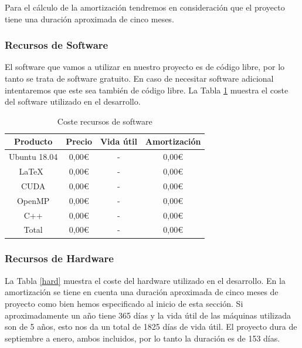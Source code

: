 \documentclass[titlepage,12pt]{report}
\begin{document}
Para el cálculo de la amortización tendremos en consideración que el proyecto tiene una duración aproximada de cinco meses.

\subsubsection{Recursos de Software}

El software que vamos a utilizar en nuestro proyecto es de código libre, por lo tanto se trata de software gratuito. En caso de necesitar software adicional intentaremos que este sea también de código libre. La Tabla \ref{soft} muestra el coste del software utilizado en el desarrollo.

\begin{table}[H]
	\centering
	\begin{tabular}{|c|c|c|c|}
		\hline
		\textbf{Producto} & \textbf{Precio} & \textbf{Vida útil} & \textbf{Amortización} \\ \hline \hline
		Ubuntu 18.04 	& 0,00€ & - & 0,00€ \\ \hline
		\LaTeX\ 		& 0,00€ & - & 0,00€ \\ \hline
		CUDA 			& 0,00€ & - & 0,00€ \\ \hline
		OpenMP 			& 0,00€ & - & 0,00€ \\ \hline
		C++ 			& 0,00€ & - & 0,00€ \\ \hline	\hline
		Total 			& 0,00€ & - & 0,00€ \\ \hline
	\end{tabular}
	\caption{Coste recursos de software}
	\label{soft}
\end{table}

\subsubsection{Recursos de Hardware}

La Tabla \ref{hard} muestra el coste del hardware utilizado en el desarrollo. En la amortización se tiene en cuenta una duración aproximada de cinco meses de proyecto como bien hemos especificado al inicio de esta sección. Si aproximadamente un año tiene 365 días y la vida útil de las máquinas utilizada son de 5 años, esto nos da un total de 1825 días de vida útil. El proyecto dura de septiembre a enero, ambos incluidos, por lo tanto la duración es de 153 días.
\end{document}
